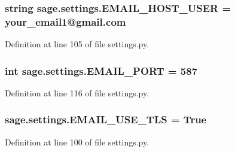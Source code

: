 \subsubsection[{E\+M\+A\+I\+L\+\_\+\+H\+O\+S\+T\+\_\+\+U\+S\+E\+R}]{\setlength{\rightskip}{0pt plus 5cm}string sage.\+settings.\+E\+M\+A\+I\+L\+\_\+\+H\+O\+S\+T\+\_\+\+U\+S\+E\+R = \textquotesingle{}your\+\_\+email1@gmail.\+com\textquotesingle{}}\label{a00043_a9c01855359753a3c3f517341806347c2}


Definition at line 105 of file settings.\+py.

\hypertarget{a00043_a3fe927460bba6408b5df39fa8a10d367}{}
\subsubsection[{E\+M\+A\+I\+L\+\_\+\+P\+O\+R\+T}]{\setlength{\rightskip}{0pt plus 5cm}int sage.\+settings.\+E\+M\+A\+I\+L\+\_\+\+P\+O\+R\+T = 587}\label{a00043_a3fe927460bba6408b5df39fa8a10d367}


Definition at line 116 of file settings.\+py.

\hypertarget{a00043_a0fe7c4174cb1b7d03f7b574ae1e5eed9}{}
\subsubsection[{E\+M\+A\+I\+L\+\_\+\+U\+S\+E\+\_\+\+T\+L\+S}]{\setlength{\rightskip}{0pt plus 5cm}sage.\+settings.\+E\+M\+A\+I\+L\+\_\+\+U\+S\+E\+\_\+\+T\+L\+S = True}\label{a00043_a0fe7c4174cb1b7d03f7b574ae1e5eed9}


Definition at line 100 of file settings.\+py.

\hypertarget{a00043_af48e999a4a4e7f8830d84ac4eb08df1a}{}
